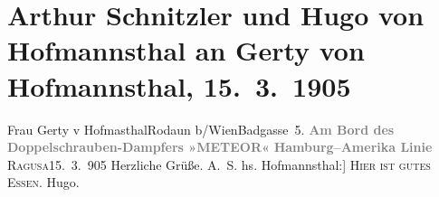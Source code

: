 

         
         \renewcommand{\erwaehntePersonen}{Personen: Gertrude von Hofmannsthal}
         \renewcommand{\erwaehnteOrte}{Orte: Amerika, Badgasse, Dubrovnik, Hamburg, Rijeka, Rodaun}
         \renewcommand{\erwaehnteWerke}{}
               \section[Arthur Schnitzler und Hugo von Hofmannsthal an Gerty von Hofmannsthal, 15. 3. 1905]{ Arthur Schnitzler und Hugo von Hofmannsthal an Gerty von Hofmannsthal,
               15. 3. 1905}\nopagebreak{}\rehead{ }\begin{ledgroupsized}[t]{13cm}\normalsize\beginnumbering \toendnotes[C]{\smallbreak\pagebreak[2]} 
\pstart{}{\pb}Frau Gerty v Hofma{\geminationn}sthal\pend{}\pstart{}Rodaun b/Wien\pend{}\pstart{}Badgasse 5.\pend{}{\bigskip}\pstart
           \noindent{}\centering{}\textcolor{gray}{\textbf{{\pb}Am Bord des Doppelschrauben-Dampfers »METEOR«}}\pend
           \pstart
           \noindent{}\centering{}\textcolor{gray}{\textbf{Hamburg–Amerika Linie}}\pend
           \pstart
           {\pb}\textsc{Ragusa}15. 3. 905\pend
           \pstart
           Herzliche Grüße.\pend
           \pstart \spacefill\mbox{A. S.}\pend{}\pstart
           \noindent{}{[}hs. Hofmannsthal:{]} \textsc{Hier ist gutes Essen.}\pend
           \pstart \spacefill\mbox{Hugo.}\pend{}
         
         \endnumbering{}\end{ledgroupsized}  \newcommand{\dateiname}{L01509}\newcommand{\titel}{Arthur Schnitzler und Hugo von Hofmannsthal an Gerty von Hofmannsthal, 15. 3. 1905}\newcommand{\editorInnen}{Martin Anton Müller und Gerd-Hermann Susen}
      